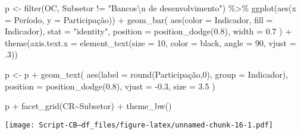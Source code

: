 \documentclass[
]{article}
\newenvironment{Shaded}{\begin{snugshade}}{\end{snugshade}}
\newcommand{\AttributeTok}[1]{\textcolor[rgb]{0.77,0.63,0.00}{#1}}
\newcommand{\DecValTok}[1]{\textcolor[rgb]{0.00,0.00,0.81}{#1}}
\newcommand{\FloatTok}[1]{\textcolor[rgb]{0.00,0.00,0.81}{#1}}
\newcommand{\FunctionTok}[1]{\textcolor[rgb]{0.00,0.00,0.00}{#1}}
\newcommand{\NormalTok}[1]{#1}
\newcommand{\OtherTok}[1]{\textcolor[rgb]{0.56,0.35,0.01}{#1}}
\newcommand{\SpecialCharTok}[1]{\textcolor[rgb]{0.00,0.00,0.00}{#1}}
\newcommand{\StringTok}[1]{\textcolor[rgb]{0.31,0.60,0.02}{#1}}
\begin{document}
\begin{Shaded}
\begin{Highlighting}[]
\NormalTok{p }\OtherTok{\textless{}{-}} 
  \FunctionTok{filter}\NormalTok{(OC, Subsetor }\SpecialCharTok{!=} \StringTok{"Bancos}\SpecialCharTok{\textbackslash{}n}\StringTok{ de desenvolvimento"}\NormalTok{) }\SpecialCharTok{\%\textgreater{}\%}
  \FunctionTok{ggplot}\NormalTok{(}\FunctionTok{aes}\NormalTok{(}\AttributeTok{x =}\NormalTok{ Período, }\AttributeTok{y =}\NormalTok{ Participação)) }\SpecialCharTok{+}
  \FunctionTok{geom\_bar}\NormalTok{(}
    \FunctionTok{aes}\NormalTok{(}\AttributeTok{color =}\NormalTok{ Indicador, }\AttributeTok{fill =}\NormalTok{ Indicador),}
    \AttributeTok{stat =} \StringTok{"identity"}\NormalTok{, }\AttributeTok{position =} \FunctionTok{position\_dodge}\NormalTok{(}\FloatTok{0.8}\NormalTok{),}
    \AttributeTok{width =} \FloatTok{0.7}
\NormalTok{    ) }\SpecialCharTok{+}
  \FunctionTok{theme}\NormalTok{(}\AttributeTok{axis.text.x =} \FunctionTok{element\_text}\NormalTok{(}\AttributeTok{size =} \DecValTok{10}\NormalTok{, }
                                   \AttributeTok{color =} \StringTok{\textquotesingle{}black\textquotesingle{}}\NormalTok{, }
                                   \AttributeTok{angle =} \DecValTok{90}\NormalTok{, }
                                   \AttributeTok{vjust =}\NormalTok{ .}\DecValTok{3}\NormalTok{))}

\NormalTok{p }\OtherTok{\textless{}{-}}\NormalTok{ p }\SpecialCharTok{+} \FunctionTok{geom\_text}\NormalTok{(}
  \FunctionTok{aes}\NormalTok{(}\AttributeTok{label =} \FunctionTok{round}\NormalTok{(Participação,}\DecValTok{0}\NormalTok{), }\AttributeTok{group =}\NormalTok{ Indicador), }
  \AttributeTok{position =} \FunctionTok{position\_dodge}\NormalTok{(}\FloatTok{0.8}\NormalTok{),}
  \AttributeTok{vjust =} \SpecialCharTok{{-}}\FloatTok{0.3}\NormalTok{, }\AttributeTok{size =} \FloatTok{3.5}
\NormalTok{) }

\NormalTok{p }\SpecialCharTok{+} \FunctionTok{facet\_grid}\NormalTok{(CR}\SpecialCharTok{\textasciitilde{}}\NormalTok{Subsetor) }\SpecialCharTok{+} \FunctionTok{theme\_bw}\NormalTok{() }
\end{Highlighting}
\end{Shaded}

\texttt{[image: Script-CB---df\_files/figure-latex/unnamed-chunk-16-1.pdf]}
\end{document}
